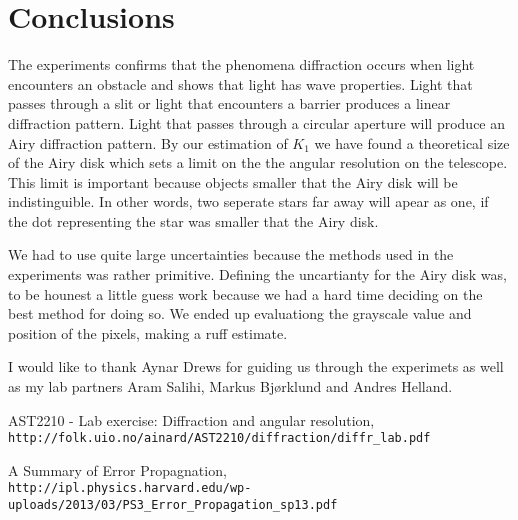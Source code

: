 \documentclass{emulateapj}
\begin{document}
\section{Conclusions}
\label{sec:conclusions}

The experiments confirms that the phenomena diffraction occurs when light encounters an obstacle and shows that light has wave properties. Light that passes through a slit or light that encounters a barrier produces a linear diffraction pattern. Light that passes through a circular aperture will produce an Airy diffraction pattern. By our estimation of $K_1$ we have found a theoretical size of the Airy disk which sets a limit on the the angular resolution on the telescope. This limit is important because objects smaller that the Airy disk will be indistinguible. In other words, two seperate stars far away will apear as one, if the dot representing the star was smaller that the Airy disk.

We had to use quite large uncertainties because the methods used in the experiments was rather primitive. Defining the uncartianty for the Airy disk was, to be hounest a little guess work because we had a hard time deciding on the best method for doing so. We ended up evaluationg the grayscale value and position of the pixels, making a ruff estimate.

\begin{acknowledgements}
  I would like to thank Aynar Drews for guiding us through the experimets as well as my lab partners Aram Salihi, Markus Bjørklund and Andres Helland.  
\end{acknowledgements}

\begin{thebibliography}{}



AST2210 - Lab exercise: Diffraction and angular resolution,
\\\texttt{http://folk.uio.no/ainard/AST2210/diffraction/diffr\_lab.pdf}

A Summary of Error Propagnation,
\\\texttt{http://ipl.physics.harvard.edu/wp-uploads/2013/03/PS3_Error_Propagation_sp13.pdf}




\end{thebibliography}
\end{document}

